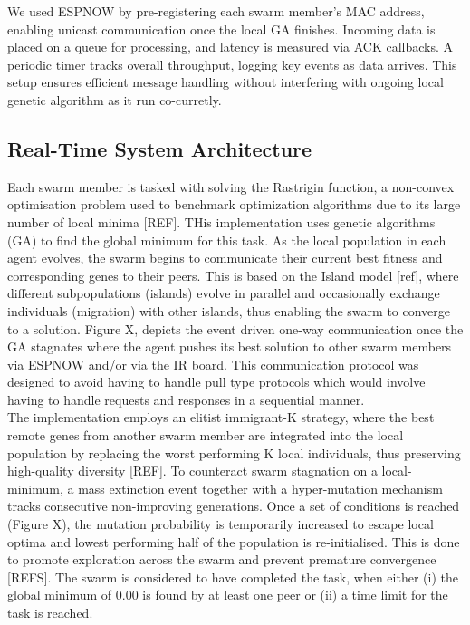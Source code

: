 \documentclass[conference]{IEEEtran}
\begin{document}
We used ESPNOW by pre-registering each swarm member’s MAC address, enabling unicast communication once the local GA finishes. Incoming data is placed on a queue for processing, and latency is measured via ACK callbacks. A periodic timer tracks overall throughput, logging key events as data arrives. This setup ensures efficient message handling without interfering with ongoing local genetic algorithm as it run co-curretly.


\subsection{Real-Time System Architecture}
Each swarm member is tasked with solving the Rastrigin function, a non-convex optimisation problem used to benchmark optimization algorithms due to its large number of local minima [REF]. THis implementation uses genetic algorithms (GA) to find the global minimum for this task. As the local population in each agent evolves, the swarm begins to communicate their current best fitness and corresponding genes to their peers. This is based on the Island model [ref], where different subpopulations (islands) evolve in parallel and occasionally exchange individuals (migration) with other islands, thus enabling the swarm to converge to a solution. Figure X, depicts the event driven one-way communication once the GA stagnates where the agent pushes its best solution to other swarm members via ESPNOW and/or via the IR board. This communication protocol was designed to avoid having to handle pull type protocols which would involve having to handle requests and responses in a sequential manner.\\  

The implementation employs an elitist immigrant-K strategy, where the best remote genes from another swarm member are integrated into the local population by replacing the worst performing K local individuals, thus preserving high-quality diversity [REF]. To counteract swarm stagnation on a local-minimum, a mass extinction event together with a hyper-mutation mechanism tracks consecutive non-improving generations. Once a set of conditions is reached (Figure X), the mutation probability is temporarily increased to escape local optima and lowest performing half of the population is re-initialised. This is done to promote exploration across the swarm and prevent premature convergence [REFS]. The swarm is considered to have completed the task, when either (i) the global minimum of 0.00 is found by at least one peer or (ii) a time limit for the task is reached.
\end{document}
